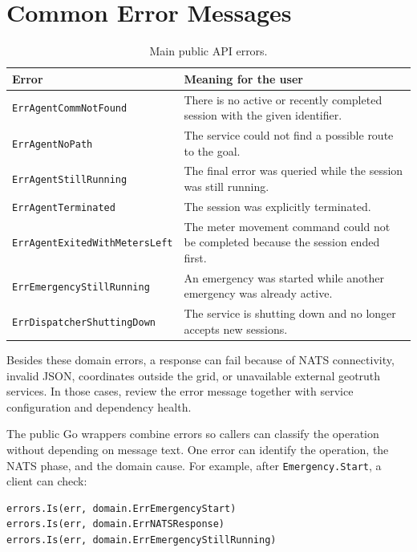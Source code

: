 \documentclass[12pt,a4paper]{report}
\begin{document}
\section{Common Error Messages}

\begin{table}[H]
\centering
\begin{tabular}{|p{}|p{}|}
\hline
\textbf{Error} & \textbf{Meaning for the user} \\
\hline
\texttt{ErrAgentCommNotFound} &
There is no active or recently completed session with the given identifier. \\
\hline
\texttt{ErrAgentNoPath} &
The service could not find a possible route to the goal. \\
\hline
\texttt{ErrAgentStillRunning} &
The final error was queried while the session was still running. \\
\hline
\texttt{ErrAgentTerminated} &
The session was explicitly terminated. \\
\hline
\texttt{ErrAgentExitedWithMetersLeft} &
The meter movement command could not be completed because the session ended
first. \\
\hline
\texttt{ErrEmergencyStillRunning} &
An emergency was started while another emergency was already active. \\
\hline
\texttt{ErrDispatcherShuttingDown} &
The service is shutting down and no longer accepts new sessions. \\
\hline
\end{tabular}
\caption{Main public API errors.}
\end{table}

Besides these domain errors, a response can fail because of NATS connectivity,
invalid JSON, coordinates outside the grid, or unavailable external geotruth
services. In those cases, review the error message together with service
configuration and dependency health.

The public Go wrappers combine errors so callers can classify the operation
without depending on message text. One error can identify the operation, the
NATS phase, and the domain cause. For example, after \texttt{Emergency.Start}, a
client can check:

\begin{lstlisting}
errors.Is(err, domain.ErrEmergencyStart)
errors.Is(err, domain.ErrNATSResponse)
errors.Is(err, domain.ErrEmergencyStillRunning)
\end{lstlisting}
\end{document}
